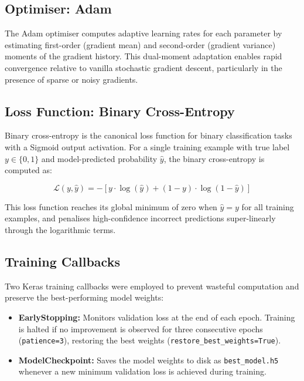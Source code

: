 \documentclass[12pt,a4paper]{report}
\begin{document}
\subsection{Optimiser: Adam}

The Adam optimiser computes adaptive learning rates for each parameter by estimating first-order (gradient mean) and second-order (gradient variance) moments of the gradient history. This dual-moment adaptation enables rapid convergence relative to vanilla stochastic gradient descent, particularly in the presence of sparse or noisy gradients.

\subsection{Loss Function: Binary Cross-Entropy}

Binary cross-entropy is the canonical loss function for binary classification tasks with a Sigmoid output activation. For a single training example with true label $y \in \{0, 1\}$ and model-predicted probability $\hat{y}$, the binary cross-entropy is computed as:

\begin{equation}
\mathcal{L}(y, \hat{y}) = -\left[y \cdot \log(\hat{y}) + (1 - y) \cdot \log(1 - \hat{y})\right]
\end{equation}

This loss function reaches its global minimum of zero when $\hat{y} = y$ for all training examples, and penalises high-confidence incorrect predictions super-linearly through the logarithmic terms.

\subsection{Training Callbacks}

Two Keras training callbacks were employed to prevent wasteful computation and preserve the best-performing model weights:

\begin{itemize}[itemsep=4pt]
    \item \textbf{EarlyStopping:} Monitors validation loss at the end of each epoch. Training is halted if no improvement is observed for three consecutive epochs (\texttt{patience=3}), restoring the best weights (\texttt{restore\_best\_weights=True}).
    \item \textbf{ModelCheckpoint:} Saves the model weights to disk as \texttt{best\_model.h5} whenever a new minimum validation loss is achieved during training.
\end{itemize}
\end{document}
